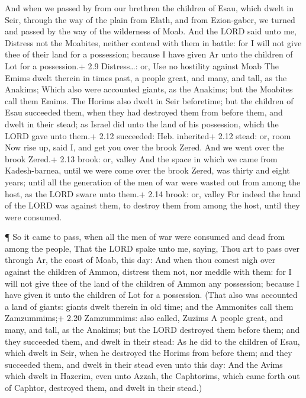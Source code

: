  And when we passed by from our brethren the children of
Esau, which dwelt in Seir, through the way of the plain from Elath, and
from Ezion-gaber, we turned and passed by the way of the wilderness of
Moab.  And the LORD said unto me, Distress not the Moabites,
neither contend with them in battle: for I will not give thee of their
land for a possession; because I have given Ar unto the children of Lot
for a possession.+ 2.9 Distress\ldots: or, Use no hostility against Moab
 The Emims dwelt therein in times past, a people great, and
many, and tall, as the Anakims;  Which also were accounted
giants, as the Anakims; but the Moabites call them Emims. 
The Horims also dwelt in Seir beforetime; but the children of Esau
succeeded them, when they had destroyed them from before them, and dwelt
in their stead; as Israel did unto the land of his possession, which the
LORD gave unto them.+ 2.12 succeeded: Heb. inherited+ 2.12 stead: or,
room  Now rise up, said I, and get you over the brook
Zered. And we went over the brook Zered.+ 2.13 brook: or, valley
 And the space in which we came from Kadesh-barnea, until
we were come over the brook Zered, was thirty and eight years; until all
the generation of the men of war were wasted out from among the host, as
the LORD sware unto them.+ 2.14 brook: or, valley  For
indeed the hand of the LORD was against them, to destroy them from among
the host, until they were consumed.

 ¶ So it came to pass, when all the men of war were
consumed and dead from among the people,  That the LORD
spake unto me, saying,  Thou art to pass over through Ar,
the coast of Moab, this day:  And when thou comest nigh
over against the children of Ammon, distress them not, nor meddle with
them: for I will not give thee of the land of the children of Ammon any
possession; because I have given it unto the children of Lot for a
possession.  (That also was accounted a land of giants:
giants dwelt therein in old time; and the Ammonites call them
Zamzummims;+ 2.20 Zamzummims: also called, Zuzims  A people
great, and many, and tall, as the Anakims; but the LORD destroyed them
before them; and they succeeded them, and dwelt in their stead:
 As he did to the children of Esau, which dwelt in Seir,
when he destroyed the Horims from before them; and they succeeded them,
and dwelt in their stead even unto this day:  And the Avims
which dwelt in Hazerim, even unto Azzah, the Caphtorims, which came
forth out of Caphtor, destroyed them, and dwelt in their stead.)

